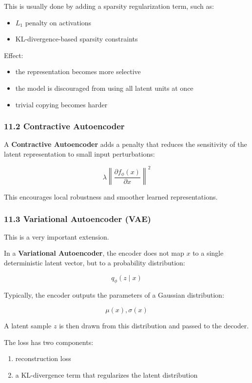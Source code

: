 \documentclass[
  italian,
  11pt,
]{article}
\begin{document}
This is usually done by adding a sparsity regularization term, such as:

\begin{itemize}
\item
  \(L_1\) penalty on activations
\item
  KL-divergence-based sparsity constraints
\end{itemize}

Effect:

\begin{itemize}
\item
  the representation becomes more selective
\item
  the model is discouraged from using all latent units at once
\item
  trivial copying becomes harder
\end{itemize}

\subsubsection{11.2 Contractive
Autoencoder}\label{contractive-autoencoder}

A \textbf{Contractive Autoencoder} adds a penalty that reduces the
sensitivity of the latent representation to small input perturbations:

\[
\lambda \left\| \frac{\partial f_\phi(x)}{\partial x} \right\|^2
\]

This encourages local robustness and smoother learned representations.

\subsubsection{11.3 Variational Autoencoder
(VAE)}\label{variational-autoencoder-vae}

This is a very important extension.

In a \textbf{Variational Autoencoder}, the encoder does not map \(x\) to
a single deterministic latent vector, but to a probability distribution:

\[
q_\phi(z \mid x)
\]

Typically, the encoder outputs the parameters of a Gaussian
distribution:

\[
\mu(x), \sigma(x)
\]

A latent sample \(z\) is then drawn from this distribution and passed to
the decoder.

The loss has two components:

\begin{enumerate}
\def\labelenumi{\arabic{enumi}.}
\item
  reconstruction loss
\item
  a KL-divergence term that regularizes the latent distribution
\end{enumerate}
\end{document}
